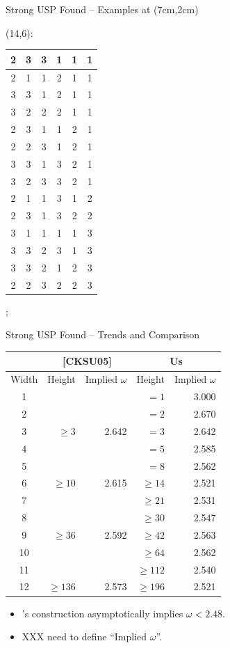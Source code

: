 \documentclass[t,10pt,
mathserif,xcolor=dvipsnames]{beamer}
\begin{document}
\begin{myframe}{Strong USP Found -- Examples}
  \tikzoverlay[text width=3cm] at (7cm,2cm) {
  (14,6):\\[.5ex]
  \begin{tabular}{|c|c|c|c|c|c|}
    \hline
    2&3&3&1&1&1 \\ \hline
    2&1&1&2&1&1 \\ \hline
    3&3&1&2&1&1 \\\hline
    3&2&2&2&1&1 \\\hline
    2&3&1&1&2&1 \\\hline
    2&2&3&1&2&1 \\\hline
    3&3&1&3&2&1 \\\hline
    3&2&3&3&2&1 \\\hline
    2&1&1&3&1&2 \\\hline
    2&3&1&3&2&2 \\\hline
    3&1&1&1&1&3 \\\hline
    3&3&2&3&1&3 \\\hline
    3&3&2&1&2&3 \\\hline
    2&2&3&2&2&3 \\\hline
  \end{tabular}
  };
  
\end{myframe}

\begin{myframe}{Strong USP Found -- Trends and Comparison}

  \begin{center}
  \begin{tabular}{|c|r|r|r|r|}
    \hline
    & \multicolumn{2}{|c|}{[CKSU05]} & \multicolumn{2}{|c|}{Us} \\
    \hline
    Width & Height & Implied $\omega$ & Height & Implied $\omega$\\
    \hline
    1 & & & $=1$ & 3.000 \\
    2 & & & $=2$ & 2.670 \\
    3 & $\ge 3$ & 2.642 & $=3$ & 2.642\\
    4 & & & $=5$ & 2.585 \\
    5 & & & $=8$ & 2.562 \\
    6 & $\ge 10$ & 2.615 &$\ge14$ & 2.521\\
    7 & & & $\ge21$ & 2.531\\
    8 & & & $\ge30$ & 2.547 \\
    9 & $\ge 36$ & 2.592 &$\ge42$ & 2.563 \\
    10 & & & $\ge64$ & 2.562 \\
    11 & & & $\ge112$ & 2.540 \\
    12 & $\ge 136$ & 2.573 &$\ge196$ & 2.521 \\
    \hline
  \end{tabular}
  \end{center}
  
  \begin{itemize}
  \item \;[CKSU05]'s construction asymptotically implies $\omega <
    2.48$.
  \item XXX need to define ``Implied $\omega$''. 
  \end{itemize}
  
\end{myframe}
\end{document}

